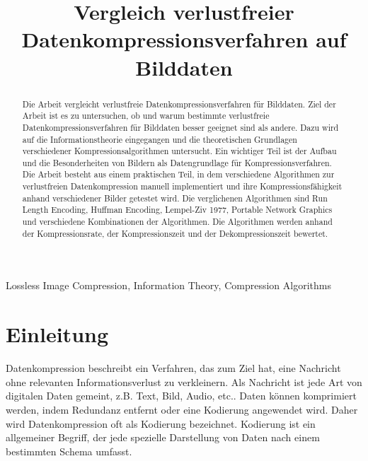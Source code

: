 \documentclass[conference]{IEEEtran}
\begin{document}
\title{Vergleich verlustfreier Datenkompressionsverfahren auf Bilddaten}

\author{
}

\maketitle

\begin{abstract}

  Die Arbeit vergleicht verlustfreie Datenkompressionsverfahren für Bilddaten.
  Ziel der Arbeit ist es zu untersuchen, ob und warum bestimmte verlustfreie 
  Datenkompressionsverfahren für Bilddaten besser geeignet sind als andere.
  Dazu wird auf die Informationstheorie eingegangen und die theoretischen 
  Grundlagen verschiedener Kompressionsalgorithmen untersucht.
  Ein wichtiger Teil ist der Aufbau und die Besonderheiten von Bildern als 
  Datengrundlage für Kompressionsverfahren.
  Die Arbeit besteht aus einem praktischen Teil, in dem verschiedene Algorithmen 
  zur verlustfreien Datenkompression manuell implementiert und ihre Kompressionsfähigkeit 
  anhand verschiedener Bilder getestet wird.
  Die verglichenen Algorithmen sind Run Length Encoding, Huffman Encoding,
  Lempel-Ziv 1977, Portable Network Graphics und verschiedene Kombinationen der Algorithmen.
  Die Algorithmen werden anhand der Kompressionsrate, der Kompressionszeit und der 
  Dekompressionszeit bewertet.

\end{abstract}


\begin{IEEEkeywords}
  Lossless Image Compression, Information Theory, Compression Algorithms
\end{IEEEkeywords}

\section{Einleitung}

Datenkompression beschreibt ein Verfahren, das zum Ziel hat, eine Nachricht
ohne relevanten Informationsverlust zu verkleinern.
Als Nachricht ist jede Art von digitalen Daten gemeint, z.B. Text, Bild, Audio, etc..
Daten können komprimiert werden, indem Redundanz entfernt oder eine Kodierung angewendet wird.
Daher wird Datenkompression oft als Kodierung bezeichnet.
Kodierung ist ein allgemeiner Begriff, der jede spezielle Darstellung von Daten nach
einem bestimmten Schema umfasst. \cite{Ingles}
\end{document}
